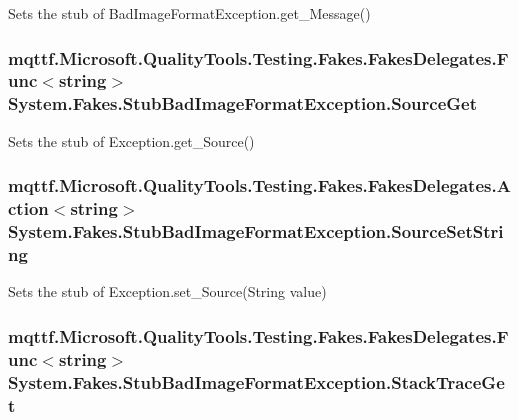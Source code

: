 Sets the stub of Bad\-Image\-Format\-Exception.\-get\-\_\-\-Message()

\hypertarget{class_system_1_1_fakes_1_1_stub_bad_image_format_exception_a743a59069733a7c026f9583f8c2c46bc}{
\subsubsection[{Source\-Get}]{\setlength{\rightskip}{0pt plus 5cm}mqttf.\-Microsoft.\-Quality\-Tools.\-Testing.\-Fakes.\-Fakes\-Delegates.\-Func$<$string$>$ System.\-Fakes.\-Stub\-Bad\-Image\-Format\-Exception.\-Source\-Get}}\label{class_system_1_1_fakes_1_1_stub_bad_image_format_exception_a743a59069733a7c026f9583f8c2c46bc}


Sets the stub of Exception.\-get\-\_\-\-Source()

\hypertarget{class_system_1_1_fakes_1_1_stub_bad_image_format_exception_a830084d6ce562b6d6839daf9b9682cf1}{
\subsubsection[{Source\-Set\-String}]{\setlength{\rightskip}{0pt plus 5cm}mqttf.\-Microsoft.\-Quality\-Tools.\-Testing.\-Fakes.\-Fakes\-Delegates.\-Action$<$string$>$ System.\-Fakes.\-Stub\-Bad\-Image\-Format\-Exception.\-Source\-Set\-String}}\label{class_system_1_1_fakes_1_1_stub_bad_image_format_exception_a830084d6ce562b6d6839daf9b9682cf1}


Sets the stub of Exception.\-set\-\_\-\-Source(\-String value)

\hypertarget{class_system_1_1_fakes_1_1_stub_bad_image_format_exception_a4eef2a7260797ee30450867aa4913540}{
\subsubsection[{Stack\-Trace\-Get}]{\setlength{\rightskip}{0pt plus 5cm}mqttf.\-Microsoft.\-Quality\-Tools.\-Testing.\-Fakes.\-Fakes\-Delegates.\-Func$<$string$>$ System.\-Fakes.\-Stub\-Bad\-Image\-Format\-Exception.\-Stack\-Trace\-Get}}\label{class_system_1_1_fakes_1_1_stub_bad_image_format_exception_a4eef2a7260797ee30450867aa4913540}


